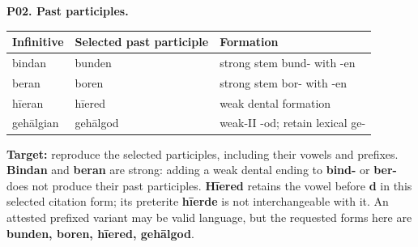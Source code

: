 \par\begin{minipage}{\linewidth}\raggedright
\textbf{P02. Past participles.}

\par\begingroup
\fontsize{10.5}{13.2}\selectfont
\setlength{\LTleft}{0pt}\setlength{\LTright}{\fill}
\noindent
\begin{tabular}{@{}>{\raggedright\arraybackslash}p{26.19mm}>{\raggedright\arraybackslash}p{42.69mm}>{\raggedright\arraybackslash}p{49.5mm}@{}}
\toprule
\textbf{Infinitive} & \textbf{Selected past participle} & \textbf{Formation} \\
\midrule
bindan & bunden & strong stem bund- with -en \\
beran & boren & strong stem bor- with -en \\
hīeran & hīered & weak dental formation \\
gehālgian & gehālgod & weak-II -od; retain lexical ge- \\
\bottomrule
\end{tabular}
\par\endgroup

\textbf{Target:} reproduce the selected participles, including their vowels and prefixes. \textbf{Bindan} and \textbf{beran} are strong: adding a weak dental ending to \textbf{bind-} or \textbf{ber-} does not produce their past participles. \textbf{Hīered} retains the vowel before \textbf{d} in this selected citation form; its preterite \textbf{hīerde} is not interchangeable with it. An attested prefixed variant may be valid language, but the requested forms here are \textbf{bunden, boren, hīered, gehālgod}.

\end{minipage}\par\addvspace{4pt}

